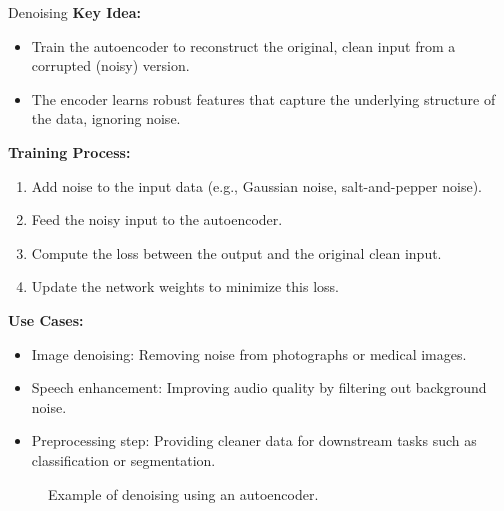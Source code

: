 \begin{frame}[allowframebreaks]{Denoising}
    \textbf{Key Idea:}
    \begin{itemize}
        \item Train the autoencoder to reconstruct the original, clean input from a corrupted (noisy) version.
        \item The encoder learns robust features that capture the underlying structure of the data, ignoring noise.
    \end{itemize}

    \vspace{1em}
    \textbf{Training Process:}
    \begin{enumerate}
        \item Add noise to the input data (e.g., Gaussian noise, salt-and-pepper noise).
        \item Feed the noisy input to the autoencoder.
        \item Compute the loss between the output and the original clean input.
        \item Update the network weights to minimize this loss.
    \end{enumerate}

    \framebreak

    \textbf{Use Cases:}
    \begin{itemize}
        \item Image denoising: Removing noise from photographs or medical images.
        \item Speech enhancement: Improving audio quality by filtering out background noise.
        \item Preprocessing step: Providing cleaner data for downstream tasks such as classification or segmentation.
    \end{itemize}

    \framebreak

    \begin{figure}
        \centering
        \caption*{Example of denoising using an autoencoder.}
    \end{figure}
\end{frame}